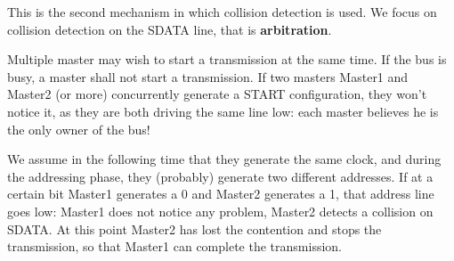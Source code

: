 \documentclass[a4paper,11pt]{article}
\begin{document}
This is the second mechanism in which collision detection is used.
We focus on collision detection on the SDATA line, that is \textbf{arbitration}.

Multiple master may wish to start a transmission at the same time.
If the bus is busy, a master shall not start a transmission.
If two masters Master1 and Master2 (or more) concurrently generate a START configuration, they won’t notice it, as they are both driving the same line low: each master believes he is the only owner of the bus!

We assume in the following time that they generate the same clock, and during the addressing phase, they (probably) generate two different addresses.
If at a certain bit Master1 generates a 0 and Master2 generates a 1, that address line goes low: Master1 does not notice any problem, Master2 detects a collision on SDATA.
At this point Master2 has lost the contention and stops the transmission, so that Master1 can complete the transmission.
\end{document}
